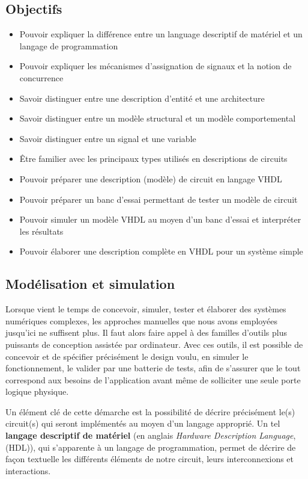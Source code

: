 \documentclass[11pt]{article}
\begin{document}
\subsection{Objectifs}
\label{sec:orga0cd77e}
\begin{itemize}
\item Pouvoir expliquer la différence entre un language descriptif de
matériel et un langage de programmation
\item Pouvoir expliquer les mécanismes d'assignation de signaux et la notion de concurrence
\item Savoir distinguer entre une description d'entité et une architecture
\item Savoir distinguer entre un modèle structural et un modèle
comportemental
\item Savoir distinguer entre un signal et une variable
\item Être familier avec les principaux types utilisés en descriptions
de circuits
\item Pouvoir préparer une description (modèle) de circuit en langage VHDL
\item Pouvoir préparer un banc d'essai permettant de tester un modèle de circuit
\item Pouvoir simuler un modèle VHDL au moyen d'un banc d'essai et
interpréter les résultats
\item Pouvoir élaborer une description complète en VHDL pour un système simple
\end{itemize}


\subsection{Modélisation et simulation}
\label{sec:orgf40c8f8}

Lorsque vient le temps de concevoir, simuler, tester et élaborer des
systèmes numériques complexes, les approches manuelles que nous avons
employées jusqu'ici ne suffisent plus. Il faut alors faire appel à des
familles d'outils plus puissants de conception assistée par
ordinateur. Avec ces outils, il est possible de concevoir et de
spécifier précisément le design voulu, en simuler le fonctionnement,
le valider par une batterie de tests, afin de s'assurer que le tout
correspond aux besoins de l'application avant même de solliciter une
seule porte logique physique.

Un élément clé de cette démarche est la possibilité de décrire
précisément le(s) circuit(s) qui seront implémentés au moyen d'un
langage approprié. Un tel \textbf{langage descriptif de matériel} (en anglais
\emph{Hardware Description Language}, (HDL)), qui s'apparente à un langage
de programmation, permet de décrire de façon textuelle les différents
éléments de notre circuit, leurs interconnexions et interactions.
\end{document}
